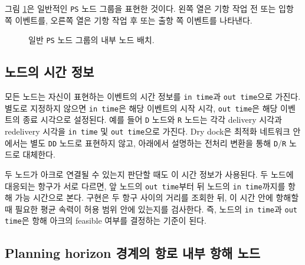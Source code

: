 \documentclass[11pt]{article}
\begin{document}
그림 \ref{fig:generic-node-group}은 일반적인 \texttt{PS} 노드 그룹을 표현한 것이다. 
왼쪽 열은 기항 작업 전 또는 입항 쪽 이벤트를, 오른쪽 열은 기항 작업 후 또는 출항 쪽 이벤트를 나타낸다.

\begin{figure}[H]
\centering
{}
\caption{일반 \texttt{PS} 노드 그룹의 내부 노드 배치.}
\label{fig:generic-node-group}
\end{figure}

\subsection{노드의 시간 정보}

모든 노드는 자신이 표현하는 이벤트의 시간 정보를 \texttt{in time}과
\texttt{out time}으로 가진다. 별도로 지정하지 않으면 \texttt{in time}은 해당
이벤트의 시작 시각, \texttt{out time}은 해당 이벤트의 종료 시각으로 설정된다.
예를 들어 \texttt{D} 노드와 \texttt{R} 노드는 각각 delivery 시각과 redelivery
시각을 \texttt{in time} 및 \texttt{out time}으로 가진다. Dry dock은 최적화
네트워크 안에서는 별도 \texttt{DD} 노드로 표현하지 않고, 아래에서 설명하는
전처리 변환을 통해 \texttt{D}/\texttt{R} 노드로 대체한다.

두 노드가 아크로 연결될 수 있는지 판단할 때도 이 시간 정보가 사용된다. 두 노드에
대응되는 항구가 서로 다르면, 앞 노드의 \texttt{out time}부터 뒤 노드의
\texttt{in time}까지를 항해 가능 시간으로 본다. 구현은 두 항구 사이의 거리를
조회한 뒤, 이 시간 안에 항해할 때 필요한 평균 속력이 허용 범위 안에 있는지를
검사한다. 즉, 노드의 \texttt{in time}과 \texttt{out time}은 
항해 아크의 feasible 여부를 결정하는 기준이 된다.

\subsection{Planning horizon 경계의 항로 내부 항해 노드}
\end{document}
